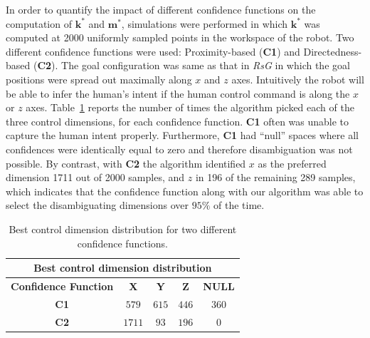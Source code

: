 \documentclass[conference]{IEEEtran}
\begin{document}
In order to quantify the impact of different confidence functions on the computation of $\boldsymbol{k^*}$ and $\boldsymbol{m^*}$, simulations were performed in which $\boldsymbol{k^*}$ was computed at 2000 uniformly sampled points in the workspace of the robot. Two different confidence functions were used: Proximity-based (\textbf{C1}) and Directedness-based (\textbf{C2}). The goal configuration was same as that in \textit{RsG} in which the goal positions were spread out maximally along $x$ and $z$ axes. Intuitively the robot will be able to infer the human's intent if the human control command is along the $x$ or $z$ axes. Table~\ref{HMD} reports the number of times the algorithm picked each of the three control dimensions, for each confidence function.  
\textbf{C1} often was unable to capture the human intent properly. Furthermore, \textbf{C1} had ``null'' spaces where all confidences were identically equal to zero and therefore disambiguation was not possible. By contrast, with \textbf{C2} the algorithm identified $x$ as the preferred dimension 1711 out of 2000 samples, and $z$ in 196 of the remaining 289 samples, which indicates that the confidence function along with our algorithm was able to select the disambiguating dimensions over $95\%$ of the time. 
\begin{table}[t]
	\centering
	\begin{tabular}{|c|c|c|c|c|}
		\hline
		\multicolumn{5}{|c|}{Best control dimension distribution} \\
		\hline
		\textbf{Confidence Function} & \textbf{X} & \textbf{Y} & \textbf{Z} & \textbf{NULL} \\ \hline
		
		\textbf{C1} & $579$ & $615$ & $446$ & $360$ \\ \hline
		\textbf{C2} & $1711$ & $93$ & $196$ & $0$\\ \hline
		
	\end{tabular}
	\vspace{.2cm}
	\caption{Best control dimension distribution for two different confidence functions.} 
	\label{HMD}
	\vspace{-.5cm}
\end{table}
\end{document}
